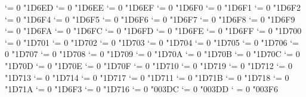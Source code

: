 \Umathcode `\Μ = 0 \alphafam "1D6ED
\Umathcode `\Ν = 0 \alphafam "1D6EE
\Umathcode `\Ξ = 0 \alphafam "1D6EF
\Umathcode `\Ο = 0 \alphafam "1D6F0
\Umathcode `\Π = 0 \alphafam "1D6F1
\Umathcode `\Ρ = 0 \alphafam "1D6F2
\Umathcode `\Σ = 0 \alphafam "1D6F4
\Umathcode `\Τ = 0 \alphafam "1D6F5
\Umathcode `\Υ = 0 \alphafam "1D6F6
\Umathcode `\Φ = 0 \alphafam "1D6F7
\Umathcode `\Χ = 0 \alphafam "1D6F8
\Umathcode `\Ψ = 0 \alphafam "1D6F9
\Umathcode `\Ω = 0 \alphafam "1D6FA
\Umathcode `\α = 0 \alphafam "1D6FC
\Umathcode `\β = 0 \alphafam "1D6FD
\Umathcode `\γ = 0 \alphafam "1D6FE
\Umathcode `\δ = 0 \alphafam "1D6FF
\Umathcode `\ε = 0 \alphafam "1D700
\Umathcode `\ζ = 0 \alphafam "1D701
\Umathcode `\η = 0 \alphafam "1D702
\Umathcode `\θ = 0 \alphafam "1D703
\Umathcode `\ι = 0 \alphafam "1D704
\Umathcode `\κ = 0 \alphafam "1D705
\Umathcode `\λ = 0 \alphafam "1D706
\Umathcode `\μ = 0 \alphafam "1D707
\Umathcode `\ν = 0 \alphafam "1D708
\Umathcode `\ξ = 0 \alphafam "1D709
\Umathcode `\ο = 0 \alphafam "1D70A
\Umathcode `\π = 0 \alphafam "1D70B
\Umathcode `\ρ = 0 \alphafam "1D70C
\Umathcode `\ς = 0 \alphafam "1D70D
\Umathcode `\σ = 0 \alphafam "1D70E
\Umathcode `\τ = 0 \alphafam "1D70F
\Umathcode `\υ = 0 \alphafam "1D710
\Umathcode `\φ = 0 \alphafam "1D719
\Umathcode `\χ = 0 \alphafam "1D712
\Umathcode `\ψ = 0 \alphafam "1D713
\Umathcode `\ω = 0 \alphafam "1D714
\Umathcode `\ϑ = 0 \alphafam "1D717
\Umathcode `\ϕ = 0 \alphafam "1D711
\Umathcode `\ϖ = 0 \alphafam "1D71B
\Umathcode `\ϰ = 0 \alphafam "1D718
\Umathcode `\ϱ = 0 \alphafam "1D71A
\Umathcode `\ϴ = 0 \alphafam "1D6F3
\Umathcode `\ϵ = 0 \alphafam "1D716
\Umathcode `\Ϝ = 0 \alphafam "003DC
\Umathcode `\ϝ = 0 \alphafam "003DD
\Umathcode `\϶ = 0 \alphafam "003F6



\let\Alpha=Α      \let\Beta=Β     \let\Gamma=Γ    \let\Delta=Δ
\let\Epsilon=Ε    \let\Zeta=Ζ     \let\Eta=Η      \let\Theta=Θ
\let\Iota=Ι       \let\Kappa=Κ    \let\Lambda=Λ   \let\Mu=Μ
\let\Nu=Ν         \let\Xi=Ξ       \let\Omicron=Ο  \let\Pi=Π
\let\Rho=Ρ        \let\Sigma=Σ    \let\Tau=Τ      \let\Upsilon=Υ
\let\Phi=Φ        \let\Chi=Χ      \let\Psi=Ψ      \let\Omega=Ω
\let\alpha=α      \let\beta=β     \let\gamma=γ    \let\delta=δ
\let\varepsilon=ε \let\zeta=ζ     \let\eta=η      \let\theta=θ
\let\iota=ι       \let\kappa=κ    \let\lambda=λ   \let\mu=μ
\let\nu=ν         \let\xi=ξ       \let\omicron=ο  \let\pi=π
\let\rho=ρ        \let\varsigma=ς \let\sigma=σ    \let\tau=τ
\let\upsilon=υ    \let\phi=φ      \let\chi=χ      \let\psi=ψ
\let\omega=ω      \let\vartheta=ϑ \let\varphi=ϕ   \let\varpi=ϖ
\let\varkappa=ϰ   \let\varrho=ϱ   \let\varTheta=ϴ \let\epsilon=ϵ


